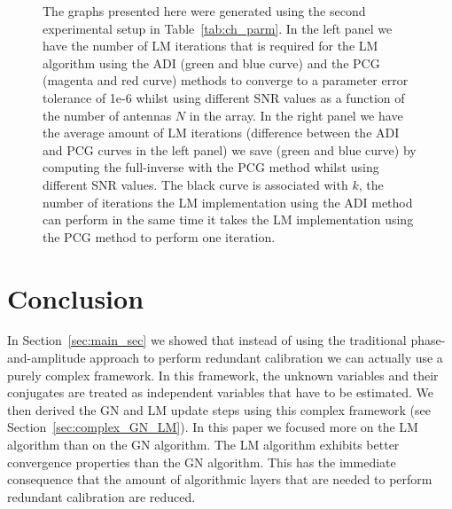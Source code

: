 \documentclass[useAMS,usenatbib]{mn2e}
\begin{document}
\begin{figure}
\centering
{}
\caption{The graphs presented here were generated using the second experimental setup in Table~\ref{tab:ch_parm}. In the left panel we have the number of LM iterations 
that is required for the LM algorithm using the ADI (green and blue curve) and the PCG (magenta and red curve) methods to converge to a parameter error tolerance of 1e-6 whilst using different 
SNR values as a function of the number of antennas $N$ in the array. In the right panel we have the average amount of LM iterations (difference between the ADI and PCG curves in the left panel) we save (green and blue curve) by computing the full-inverse with the PCG method whilst using different SNR values.
The black curve is associated with $k$, the number of iterations the LM implementation using the ADI method can perform in the same time it takes the LM implementation using 
the PCG method to perform one iteration.
\label{fig:out_diff}} 
\end{figure}

\section{Conclusion}
In Section~\ref{sec:main_sec} we showed that instead of using the traditional phase-and-amplitude approach to perform redundant calibration we can actually use a purely complex 
framework. In this framework, the unknown variables and their conjugates are treated as independent variables that have to be estimated. 
We then derived the GN and LM update steps using this complex framework (see Section~\ref{sec:complex_GN_LM}). In this paper we focused more on the LM algorithm than on the GN algorithm. The LM algorithm exhibits better convergence properties than the 
GN algorithm. This has the immediate consequence that the amount of algorithmic layers that are needed to perform redundant calibration are reduced.
\end{document}
